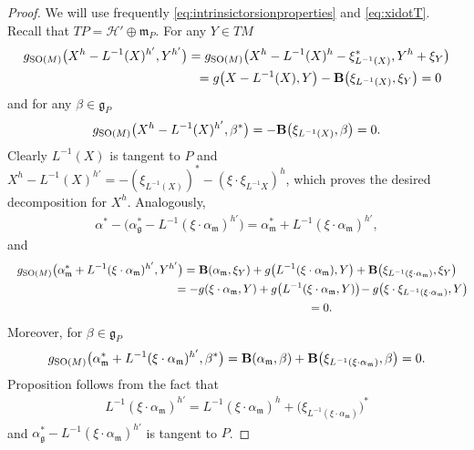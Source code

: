 \documentclass[pdftex]{sigma}
\numberwithin{equation}{section}
\begin{document}
\begin{proof}
We will use frequently \eqref{eq:intrinsictorsionproperties} and \eqref{eq:xidotT}. Recall that $TP=\mathcal{H}'\oplus\mathfrak{m}_P$. For any $Y\in TM$
\begin{gather*}
g_{{\rm SO}(M)}\big(X^h-L^{-1}(X)^{h'},Y^{h'}\big) =g_{{\rm SO}(M)}\big(X^h-L^{-1}(X)^h-\xi_{L^{-1}(X)}^{\ast},Y^h+\xi_Y\big)\\
\hphantom{g_{{\rm SO}(M)}\big(X^h-L^{-1}(X)^{h'},Y^{h'}\big)}{} =g\big(X-L^{-1}(X),Y\big)-{\bf B}\big(\xi_{L^{-1}(X)},\xi_Y\big)=0
\end{gather*}
and for any $\beta\in\mathfrak{g}_P$
\begin{gather*}
g_{{\rm SO}(M)}\big(X^h-L^{-1}(X)^{h'},\beta^{\ast}\big)=-{\bf B}\big(\xi_{L^{-1}(X)},\beta\big)=0.
\end{gather*}
Clearly $L^{-1}(X)$ is tangent to $P$ and $X^h-L^{-1}(X)^{h'}=-(\xi_{L^{-1}(X)})^{\ast}-(\xi\cdot\xi_{L^{-1}X})^h$, which proves the desired decomposition for $X^h$. Analogously, \begin{gather*}
\alpha^{\ast}-\big(\alpha_{\mathfrak{g}}^{\ast}-L^{-1}(\xi\cdot\alpha_{\mathfrak{m}})^{h'}\big)=
\alpha_{\mathfrak{m}}^{\ast}+L^{-1}(\xi\cdot\alpha_{\mathfrak{m}})^{h'},
\end{gather*}
and
\begin{gather*}
g_{{\rm SO}(M)}\big(\alpha_{\mathfrak{m}}^{\ast}+L^{-1}(\xi\cdot\alpha_{\mathfrak{m}})^{h'},Y^{h'}\big) =
{\bf B}(\alpha_{\mathfrak{m}},\xi_Y)+g\big(L^{-1}(\xi\cdot\alpha_{\mathfrak{m}}),Y\big)+{\bf B}\big(\xi_{L^{-1}(\xi\cdot\alpha_{\mathfrak{m}})},\xi_Y\big)\\
\hphantom{g_{{\rm SO}(M)}\big(\alpha_{\mathfrak{m}}^{\ast}+L^{-1}(\xi\cdot\alpha_{\mathfrak{m}})^{h'},Y^{h'}\big)}{}
=-g(\xi\cdot\alpha_{\mathfrak{m}},Y)
+g\big(L^{-1}(\xi\cdot\alpha_{\mathfrak{m}},Y)\big)\!-g\big(\xi\cdot\xi_{L^{-1}(\xi\cdot\alpha_{\mathfrak{m}})},Y\big)\!\\
\hphantom{g_{{\rm SO}(M)}\big(\alpha_{\mathfrak{m}}^{\ast}+L^{-1}(\xi\cdot\alpha_{\mathfrak{m}})^{h'},Y^{h'}\big)}{}=0.
\end{gather*}
Moreover, for $\beta\in\mathfrak{g}_P$
\begin{gather*}
g_{{\rm SO}(M)}\big(\alpha_{\mathfrak{m}}^{\ast}+L^{-1}(\xi\cdot\alpha_{\mathfrak{m}})^{h'},\beta^{\ast}\big)=
{\bf B}(\alpha_{\mathfrak{m}},\beta)
+{\bf B}\big(\xi_{L^{-1}(\xi\cdot\alpha_{\mathfrak{m}})},\beta\big)=0.
\end{gather*}
Proposition follows from the fact that
\begin{gather*}
L^{-1}(\xi\cdot\alpha_{\mathfrak{m}})^{h'}=L^{-1}(\xi\cdot\alpha_{\mathfrak{m}})^h+\big(\xi_{L^{-1}(\xi\cdot\alpha_{\mathfrak{m}})}\big)^{\ast}
\end{gather*}
and $\alpha_{\mathfrak{g}}^{\ast}-L^{-1}(\xi\cdot\alpha_{\mathfrak{m}})^{h'}$ is tangent to $P$.
\end{proof}
\end{document}

